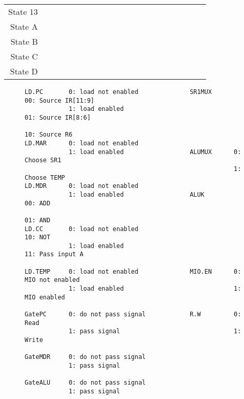 \documentclass{patt}
\begin{document}
\begin{exercises}
\begin{table}[h]
\begin{tabular}{r|c|c|c|c|c|c|c|c|c|c|c|c|c|c|c|c|}
\raisebox{0.20in}{}\raisebox{-0.10in}{} State 13 &  &  &&&&& & & \ \ & \ \ & & \ \ & \ \ && \\ \cline{2-16}
\raisebox{0.20in}{}\raisebox{-0.10in}{} State A  &  &  &&&&& & & \ \ & \ \ & & \ \ & \ \ && \\ \cline{2-16}
\raisebox{0.20in}{}\raisebox{-0.10in}{} State B  &  &  &&&&& & & \ \ & \ \ & & \ \ & \ \ && \\ \cline{2-16}
\raisebox{0.20in}{}\raisebox{-0.10in}{} State C  &  &  &&&&& & & \ \ & \ \ & & \ \ & \ \ && \\ \cline{2-16}
\raisebox{0.20in}{}\raisebox{-0.10in}{} State D  &  &  &&&&& & & \ \ & \ \ & & \ \ & \ \ && \\ \cline{2-16}
\end{tabular}
\end{table}

\begin{figure}[h!]
\begin{small}
\begin{verbatim}
LD.PC       0: load not enabled              SR1MUX      00: Source IR[11:9]
            1: load enabled                              01: Source IR[8:6]
                                                         10: Source R6
LD.MAR      0: load not enabled              
            1: load enabled                  ALUMUX      0: Choose SR1
                                                         1: Choose TEMP
LD.MDR      0: load not enabled              
            1: load enabled                  ALUK        00: ADD
                                                         01: AND 
LD.CC       0: load not enabled                          10: NOT
            1: load enabled                              11: Pass input A
                                             
LD.TEMP     0: load not enabled              MIO.EN      0: MIO not enabled
            1: load enabled                              1: MIO enabled
                                             
GatePC      0: do not pass signal            R.W         0: Read
            1: pass signal                               1: Write
                                             
GateMDR     0: do not pass signal            
            1: pass signal                   
                                             
GateALU     0: do not pass signal            
            1: pass signal                   
\end{verbatim}
\end{small}
\end{figure}


\end{exercises}
\end{document}
